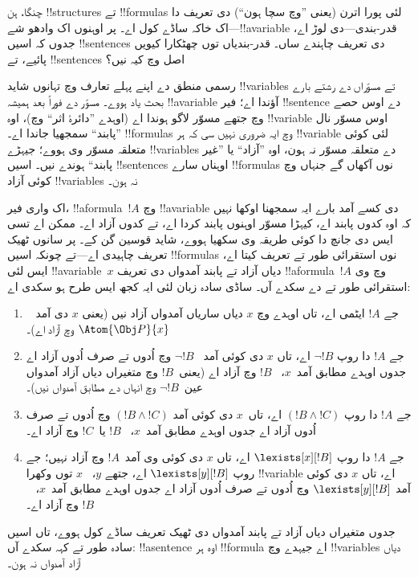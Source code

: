 \documentclass[../../../include/open-logic-section]{subfiles}
\begin{document}


چنگا، ہن !!{structure}s تے !!{formula}s
لئی پورا اترن (یعنی ”وچ سچا ہون“)
دی تعریف دا اک خاکہ ساڈے کول اے۔
پر اوہنوں اک وادھو شے---!!a{variable}
قدر-بندی---دی لوڑ اے، جدوں کہ اسیں
!!{sentence}s دی تعریف چاہندے ساں۔
قدر-بندیاں توں چھٹکارا کیویں
پائیے، تے !!{sentence}s اصل وچ
کیہ نیں؟

رسمی منطق دے اپنے پہلے تعارف وچ
تہانوں شاید !!{variable}s تے
مسوّراں دے رشتے بارے بحث یاد
ہووے۔ مسوّر دے فوراً بعد
ہمیشہ !!a{variable} آؤندا اے؛
فیر !!{sentence} دے اوس حصے
وچ جتھے مسوّر لاگو ہوندا اے
(اوہدے ”دائرۂ اثر“ وچ)،
اوہ !!{variable} اوس مسوّر
نال ”پابند“ سمجھیا جاندا اے۔
!!{formula}s وچ ایہ ضروری
نہیں سی کہ ہر !!{variable}
لئی کوئی متعلقہ مسوّر وی ہووے؛
جیہڑے !!{variable}s دے
متعلقہ مسوّر نہ ہون، اوہ
”آزاد“ یا ”غیر پابند“ ہوندے
نیں۔ اسیں !!{sentence}s
اوہناں سارے !!{formula}s
نوں آکھاں گے جنہاں وچ
کوئی آزاد !!{variable}s
نہ ہون۔

اک واری فیر، !!a{formula}~$!A$
وچ !!a{variable} دی کسے
آمد بارے ایہ سمجھنا اوکھا
نہیں کہ اوہ کدوں پابند اے،
کیہڑا مسوّر اوہنوں پابند
کردا اے، تے کدوں آزاد اے۔
ممکن اے تسی ایس دی جانچ
دا کوئی طریقہ وی سکھیا
ہووے، شاید قوسین گن کے۔
پر سانوں ٹھیک تعریف
چاہیدی اے---تے چونکہ
اسیں !!{formula}s نوں
استقرائی طور تے تعریف
کیتا اے، ایس لئی
!!a{variable}~$x$
دیاں آزاد تے پابند
آمدواں دی تعریف
!!a{formula}~$!A$ وچ وی
استقرائی طور تے دے
سکدے آں۔ ساڈی سادہ
زبان لئی ایہ کجھ
ایس طرح ہو سکدی اے:
\begin{enumerate}
  \item جے $!A$ ایٹمی اے،
  تاں اوہدے وچ $x$ دیاں
  ساریاں آمدواں آزاد نیں
  (یعنی $x$ دی آمد
  ~$\Atom{\Obj P}{x}$ وچ آزاد اے)۔
  \item جے $!A$ دا روپ
  $\lnot !B$ اے، تاں
  $x$ دی کوئی آمد
  ~$\lnot !B$ وچ اُدوں
  تے صرف اُدوں آزاد
  اے جدوں اوہدے مطابق
  آمد~$x$،
  ~$!B$ وچ آزاد اے
  (یعنی~$
  !B$ وچ متغیراں
  دیاں آزاد آمدواں
  عین~$\lnot !B$
  وچ انہاں دے مطابق
  آمدواں نیں)۔
  \item جے $!A$ دا روپ
  $(!B \land !C)$ اے،
  تاں~$x$ دی کوئی آمد
  $(!B \land !C)$ وچ
  اُدوں تے صرف اُدوں
  آزاد اے جدوں اوہدے
  مطابق آمد~$x$،
  ~$!B$ یا~$!C$
  وچ آزاد اے۔
  \item جے $!A$ دا روپ
  $\lexists[x][!B]$ اے،
  تاں $x$ دی کوئی
  وی آمد~$!A$ وچ
  آزاد نہیں؛ جے روپ
  $\lexists[y][!B]$
  اے، جتھے $y$،
  ~$x$ توں وکھرا
  !!{variable} اے،
  تاں $x$ دی کوئی
  آمد $\lexists[y][!B]$
  وچ اُدوں تے صرف
  اُدوں آزاد اے جدوں
  اوہدے مطابق آمد~$x$،
  ~$!B$ وچ آزاد اے۔
\end{enumerate}

جدوں متغیراں دیاں
آزاد تے پابند آمدواں
دی ٹھیک تعریف ساڈے
کول ہووے، تاں اسیں
سادہ طور تے کہہ سکدے
آں: !!a{sentence} اوہ
ہر !!{formula} اے
جیہدے وچ !!{variable}s
دیاں آزاد آمدواں
نہ ہون۔
\end{document}
